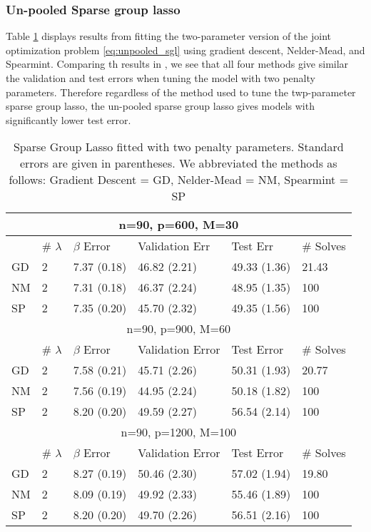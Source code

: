 \documentclass[12pt,letterpaper]{article}
\begin{document}
\subsubsection{Un-pooled Sparse group lasso}
Table \ref{table:two_param_sgl} displays results from fitting the two-parameter version of the joint optimization problem \eqref{eq:unpooled_sgl} using gradient descent, Nelder-Mead, and Spearmint. Comparing th results in \label{table:unpooled}, we see that all four methods give similar the validation and test errors when tuning the model with two penalty parameters. Therefore regardless of the method used to tune the twp-parameter sparse group lasso, the un-pooled sparse group lasso gives models with significantly lower test error.
\begin{table}
\caption{\label{table:two_param_sgl} Sparse Group Lasso fitted with two penalty parameters. Standard errors are given in parentheses. We abbreviated the methods as follows: Gradient Descent = GD, Nelder-Mead = NM, Spearmint = SP}
\centering
\begin{tabular}{| l | l | l | l | l | l | }
	\hline
	\multicolumn{6}{|c|}{n=90, p=600, M=30}\\
	\hline
	& \# $\lambda$ & $\beta$ Error & Validation Err & Test Err & \# Solves \\
	\hline
	GD & 2 & 7.37 (0.18) & 46.82 (2.21) & 49.33 (1.36)& 21.43\\
	\hline
	NM & 2 & 7.31 (0.18)  & 46.37 (2.24) & 48.95 (1.35) & 100 \\
	\hline
	SP & 2 & 7.35 (0.20) &  45.70 (2.32) & 49.35 (1.56) & 100 \\
	\hline
	\multicolumn{6}{|c|}{n=90, p=900, M=60}\\
	\hline
	& \# $\lambda$ & $\beta$ Error & Validation Error & Test Error & \# Solves \\
	\hline
	GD & 2 & 7.58 (0.21) & 45.71 (2.26) & 50.31 (1.93) & 20.77\\
	\hline
	NM & 2 & 7.56 (0.19) & 44.95 (2.24) & 50.18 (1.82) & 100  \\
	\hline
	SP & 2 & 8.20 (0.20)  & 49.59 (2.27) & 56.54 (2.14) & 100 \\
	\hline
	\multicolumn{6}{|c|}{n=90, p=1200, M=100}\\
	\hline
	& \# $\lambda$ & $\beta$ Error & Validation Error & Test Error & \# Solves \\
	\hline
	GD & 2 & 8.27 (0.19) & 50.46 (2.30) & 57.02 (1.94) & 19.80 \\
	\hline
	NM & 2 & 8.09 (0.19) & 49.92 (2.33) & 55.46 (1.89) & 100 \\
	\hline
	SP & 2 & 8.20 (0.20) & 49.70 (2.26) & 56.51 (2.16) & 100 \\
	\hline
\end{tabular}
\end{table}
\end{document}
